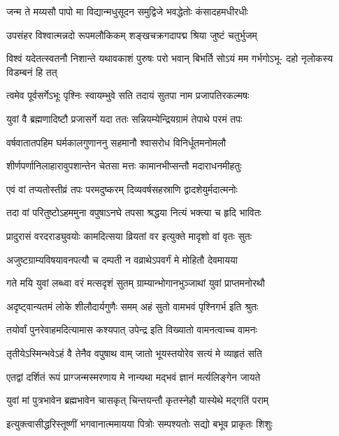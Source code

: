 \twolineshloka
{जन्म ते मय्यसौ पापो मा विद्यान्मधुसूदन}
{समुद्विजे भवद्धेतोः कंसादहमधीरधीः} %

\twolineshloka
{उपसंहर विश्वात्मन्नदो रूपमलौकिकम्}
{शङ्खचक्रगदापद्म श्रिया जुष्टं चतुर्भुजम्} %

\fourlineindentedshloka
{विश्वं यदेतत्स्वतनौ निशान्ते}
{यथावकाशं पुरुषः परो भवान्}
{बिभर्ति सोऽयं मम गर्भगोऽभू-}
{दहो नृलोकस्य विडम्बनं हि तत्} %



\twolineshloka
{त्वमेव पूर्वसर्गेऽभूः पृश्निः स्वायम्भुवे सति}
{तदायं सुतपा नाम प्रजापतिरकल्मषः} %

\twolineshloka
{युवां वै ब्रह्मणादिष्टौ प्रजासर्गे यदा ततः}
{सन्नियम्येन्द्रियग्रामं तेपाथे परमं तपः} %

\twolineshloka
{वर्षवातातपहिम घर्मकालगुणाननु}
{सहमानौ श्वासरोध विनिर्धूतमनोमलौ} %

\twolineshloka
{शीर्णपर्णानिलाहारावुपशान्तेन चेतसा}
{मत्तः कामानभीप्सन्तौ मदाराधनमीहतुः} %

\twolineshloka
{एवं वां तप्यतोस्तीव्रं तपः परमदुष्करम्}
{दिव्यवर्षसहस्राणि द्वादशेयुर्मदात्मनोः} %

\twolineshloka
{तदा वां परितुष्टोऽहममुना वपुषाऽनघे}
{तपसा श्रद्धया नित्यं भक्त्या च हृदि भावितः} %

\twolineshloka
{प्रादुरासं वरदराड्युवयोः कामदित्सया}
{व्रियतां वर इत्युक्ते मादृशो वां वृतः सुतः} %

\twolineshloka
{अजुष्टग्राम्यविषयावनपत्यौ च दम्पती}
{न वव्राथेऽपवर्गं मे मोहितौ देवमायया} %

\twolineshloka
{गते मयि युवां लब्ध्वा वरं मत्सदृशं सुतम्}
{ग्राम्यान्भोगानभुञ्जाथां युवां प्राप्तमनोरथौ} %

\twolineshloka
{अदृष्ट्वान्यतमं लोके शीलौदार्यगुणैः समम्}
{अहं सुतो वामभवं पृश्निगर्भ इति श्रुतः} %

\twolineshloka
{तयोर्वां पुनरेवाहमदित्यामास कश्यपात्}
{उपेन्द्र इति विख्यातो वामनत्वाच्च वामनः} %

\twolineshloka
{तृतीयेऽस्मिन्भवेऽहं वै तेनैव वपुषाथ वाम्}
{जातो भूयस्तयोरेव सत्यं मे व्याहृतं सति} %

\twolineshloka
{एतद्वां दर्शितं रूपं प्राग्जन्मस्मरणाय मे}
{नान्यथा मद्भवं ज्ञानं मर्त्यलिङ्गेन जायते} %

\twolineshloka
{युवां मां पुत्रभावेन ब्रह्मभावेन चासकृत्}
{चिन्तयन्तौ कृतस्नेहौ यास्येथे मद्गतिं पराम्} %



\twolineshloka
{इत्युक्त्वासीद्धरिस्तूष्णीं भगवानात्ममायया}
{पित्रोः सम्पश्यतोः सद्यो बभूव प्राकृतः शिशुः} %

